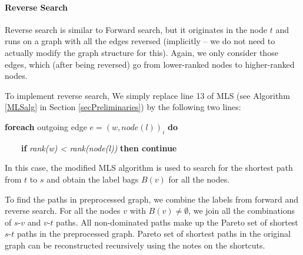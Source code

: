 \paragraph*{Reverse Search}
Reverse search is similar to Forward search, but it originates in the node $t$ and runs on a graph with all the edges reversed (implicitly -- we do not need to actually modify the graph structure for this). Again, we only consider those edges, which (after being reversed) go from lower-ranked nodes to higher-ranked nodes. 
\vskip 3mm

\noindent To implement reverse search, We simply replace line 13 of MLS (see Algorithm \ref{MLSalg} in Section \ref{secPreliminaries}) by the following two lines:
\vskip 5mm

{\bf foreach} outgoing edge $e=(w,node(l))_i$ {\bf do}

\ \ \ \ {\bf if} {\em rank(w) < rank(node(l))} {\bf then continue} 

\vskip 5mm
\noindent In this case, the modified MLS algorithm is used to search for the shortest path from $t$ to $s$ and obtain the label bags $B(v)$ for all the nodes.

%

To find the paths in preprocessed graph, we combine the labels from forward and reverse search. 
For all the nodes $v$ with $B(v) \ne \emptyset$, we join all the combinations of $s$-$v$ and $v$-$t$ paths. 
All non-dominated paths make up the Pareto set of shortest $s$-$t$ paths in the preprocessed graph.
Pareto set of shortest paths in the original graph can be reconstructed recursively using the notes on the shortcuts.

